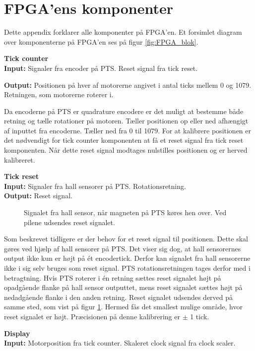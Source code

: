 \section{FPGA'ens komponenter}
\label{sec:fpgaappendix}
Dette appendix forklarer alle komponenter på FPGA'en.
Et forsimlet diagram over komponenterne på FPGA'en ses på figur \ref{fig:FPGA_blok}.


\textbf{Tick counter}\\
\textbf{Input:}
Signaler fra encoder på PTS. Reset signal fra tick reset.

\textbf{Output:} Positionen på hver af motorerne angivet i antal ticks mellem 0 
og 1079. Retningen, som motorerne roterer i. 

Da encoderne på PTS er quadrature encodere er det muligt at bestemme både retning og 
tælle rotationer på motoren.
Tæller positionen op eller ned afhængigt af inputtet fra encoderne. 
Tæller ned fra 0 til 1079.
For at kalibrere positionen er det nødvendigt for tick counter komponenten at få 
et reset signal fra tick reset komponenten. 
Når dette reset signal modtages nulstilles positionen og er herved kalibreret.

\textbf{Tick reset}\\
\textbf{Input:} Signaler fra hall sensorer på PTS. Rotationsretning.\\
\textbf{Output:} Reset signal.

\begin{figure}[!th]
\centering

\caption[Signal fra hall sensor]{Signalet fra hall sensor, når magneten på PTS køres hen over. Ved pilene udsendes reset signalet.}
\label{fig:hall_sensor_signal}
\end{figure}

Som beskrevet tidligere er der behov for et reset signal til positionen. 
Dette skal gøres ved hjælp af hall sensorer på PTS. 
Det viser sig dog, at hall sensorernes output ikke kun er højt på ét encodertick. 
Derfor kan signalet fra hall sensorerne ikke i sig selv bruges som reset signal.
PTS rotationsretningen tages derfor med i betragtning.
Hvis PTS roterer i én retning sættes reset signalet højt på opadgående 
flanke på hall sensor outputtet, mens reset signalet sættes højt på nedadgående 
flanke i den anden retning. Reset signalet udsendes derved på samme sted, som vist på figur \ref{fig:hall_sensor_signal}.
Hermed fås det smallest mulige område, hvor reset signalet er højt.
Præcisionen på denne kalibrering er $\pm$ 1 tick.

\textbf{Display}\\
\textbf{Input:} Motorposition fra tick counter. Skaleret clock signal fra clock 
scaler.

